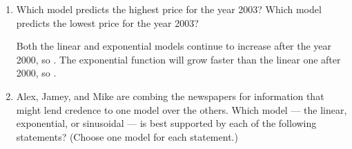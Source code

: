 \documentclass{article}
\begin{document}
\begin{enumerate}
\begin{enumerate}
\begin{enumerate}
        \begin{solution}
          The graph of the function that Mike is imagining looks like
          this:
          \begin{center}
          \end{center}
          This sinusoid has amplitude $100$, balance value $900$, and
          period 20.  Since it has a minimum at $t = 0$, it's easiest to
          model it by starting with $-\cos t$: if we stretch this
          vertically by 100, horizontally by $\frac{20}{2\pi}$, and then
          move it up by $900$, we'll get Mike's graph.  This gives us the
          formula $\boxed{ T(t) = -100\cos\left(\frac{\pi}{10}t\right) +
            900}$.
        \end{solution}

      \end{enumerate}      
      \probonly{}



        \pspace{\newpage}
  \item
    \begin{problem}[\stretch{0.8}]
      Which model predicts the highest price for the year 2003? Which
      model predicts the lowest price for the year 2003?
    \end{problem}

    \begin{solution}
      Both the linear and exponential models continue to increase after
      the year 2000, so .  The exponential function will grow faster than the linear
      one after 2000, so .  
    \end{solution}

  \item Alex, Jamey, and Mike are combing the newspapers for information
    that might lend credence to one model over the others. Which model ---
    the linear, exponential, or sinusoidal --- is best supported by each
    of the following statements?  (Choose one model for each
    statement.)
    \begin{enumerate}


\end{enumerate}
\end{enumerate}
\end{enumerate}
\end{document}
